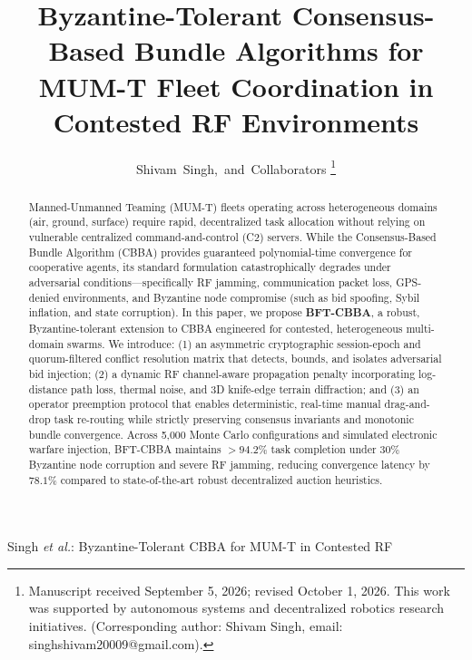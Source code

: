 \documentclass[journal,10pt,twocolumn]{IEEEtran}
\begin{document}
\title{Byzantine-Tolerant Consensus-Based Bundle Algorithms for MUM-T Fleet Coordination in Contested RF Environments}

\author{
    Shivam~Singh,~and~Collaborators%
    \thanks{Manuscript received September 5, 2026; revised October 1, 2026. This work was supported by autonomous systems and decentralized robotics research initiatives. (Corresponding author: Shivam Singh, email: singhshivam20009@gmail.com).}
}

%
{Singh \MakeLowercase{\textit{et al.}}: Byzantine-Tolerant CBBA for MUM-T in Contested RF}

\maketitle

\begin{abstract}
Manned-Unmanned Teaming (MUM-T) fleets operating across heterogeneous domains (air, ground, surface) require rapid, decentralized task allocation without relying on vulnerable centralized command-and-control (C2) servers. While the Consensus-Based Bundle Algorithm (CBBA) provides guaranteed polynomial-time convergence for cooperative agents, its standard formulation catastrophically degrades under adversarial conditions---specifically RF jamming, communication packet loss, GPS-denied environments, and Byzantine node compromise (such as bid spoofing, Sybil inflation, and state corruption). In this paper, we propose \textbf{BFT-CBBA}, a robust, Byzantine-tolerant extension to CBBA engineered for contested, heterogeneous multi-domain swarms. We introduce: (1) an asymmetric cryptographic session-epoch and quorum-filtered conflict resolution matrix that detects, bounds, and isolates adversarial bid injection; (2) a dynamic RF channel-aware propagation penalty incorporating log-distance path loss, thermal noise, and 3D knife-edge terrain diffraction; and (3) an operator preemption protocol that enables deterministic, real-time manual drag-and-drop task re-routing while strictly preserving consensus invariants and monotonic bundle convergence. Across 5,000 Monte Carlo configurations and simulated electronic warfare injection, BFT-CBBA maintains $>94.2\%$ task completion under $30\%$ Byzantine node corruption and severe RF jamming, reducing convergence latency by $78.1\%$ compared to state-of-the-art robust decentralized auction heuristics.
\end{abstract}
\end{document}
